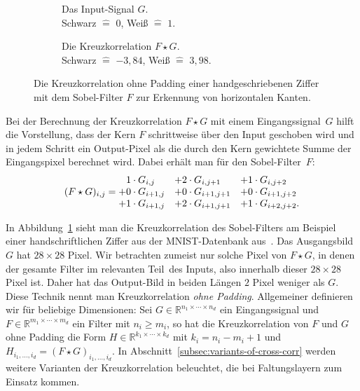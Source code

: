 \documentclass[paper=a4, 	%
		fontsize=11pt,
		abstract=true, 	%
		headsepline, 	%
		notitlepage	%
		]{scrartcl}
\theoremstyle{definition}
\newcommand{\R}{\mathbb{R}}
\begin{document}
\begin{figure}
    \centering
    \begin{subfigure}{0.4\textwidth}
        \resizebox{\textwidth}{\textwidth}{
        
        }
        \caption{Das Input-Signal $G$.\\Schwarz $\hat=$ $0$, Weiß $\hat=$ $1$.}
    \end{subfigure}%
    \begin{subfigure}{0.4\textwidth}
        \resizebox{0.9285\textwidth}{0.9285\textwidth}{
        
        }
    \caption{Die Kreuzkorrelation $F\star G$.\\Schwarz $\hat=$ $-3{,}84$, Weiß $\hat=$ $3{,}98$.}
    \end{subfigure}
    \caption{Die Kreuzkorrelation ohne Padding einer handgeschriebenen Ziffer mit dem Sobel-Filter $F$ zur Erkennung von horizontalen Kanten.}
    \label{fig:sobel-on-mnist}
\end{figure}

Bei der Berechnung der Kreuzkorrelation $F\star G$ mit einem Eingangssignal~$G$ hilft die Vorstellung, dass der Kern $F$ schrittweise über den Input geschoben wird und in jedem Schritt ein Output-Pixel als die durch den Kern gewichtete Summe der Eingangspixel berechnet wird.
Dabei erhält man für den Sobel-Filter~$F$:
\[
(F\star G)_{i,j} = \begin{matrix*}[l]
    \hphantom{+}1\cdot G_{i,j}  & + 2\cdot G_{i, j+1} & + 1\cdot G_{i, j+2} \\
    + 0\cdot G_{i+1, j} &+ 0\cdot G_{i+1, j+1} &+ 0\cdot G_{i+1, j+2} \\
    +1\cdot G_{i+1, j} &+ 2\cdot G_{i+1, j+1} &+ 1\cdot G_{i+2, j+2}.
    \end{matrix*}
\]

In Abbildung~\ref{fig:sobel-on-mnist} sieht man die Kreuzkorrelation des Sobel-Filters am Beispiel einer handschriftlichen Ziffer aus der MNIST-Datenbank aus~\cite{lecun2010mnist}.
Das Ausgangsbild $G$ hat $28\times 28$ Pixel.
Wir betrachten zumeist nur solche Pixel von $F\star G$, in denen der gesamte Filter im \glqq relevanten Teil\grqq\ des Inputs, also innerhalb dieser $28\times 28$ Pixel ist.
Daher hat das Output-Bild in beiden Längen $2$ Pixel weniger als $G$.
Diese Technik nennt man Kreuzkorrelation \emph{ohne Padding}.
Allgemeiner definieren wir für beliebige Dimensionen: Sei $G\in\R^{n_1\times\cdots \times n_d}$ ein Eingangssignal und $F\in\R^{m_1\times\cdots\times m_d}$ ein Filter mit $n_i \geq m_i$, so hat die Kreuzkorrelation von $F$ und $G$ ohne Padding die Form $H\in\R^{k_1\times\cdots\times k_d}$ mit $k_i = n_i - m_i + 1$ und $H_{i_1,\dots,i_d} = (F\star G)_{i_1,\dots,i_d}$. 
In Abschnitt~\ref{subsec:variants-of-cross-corr} werden weitere Varianten der Kreuzkorrelation beleuchtet, die bei Faltungslayern zum Einsatz kommen.
\end{document}
